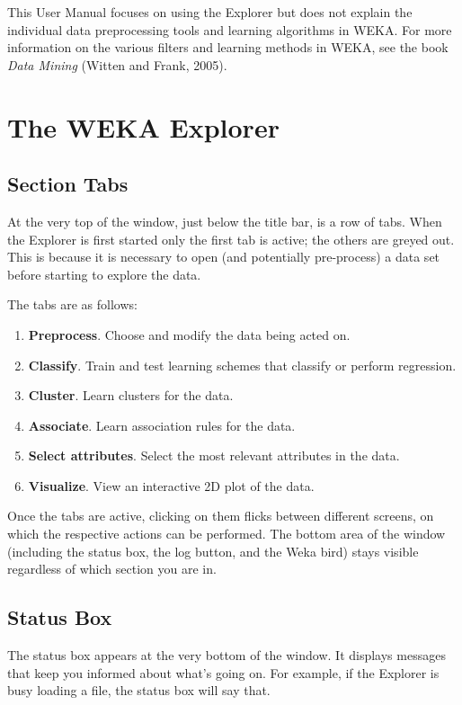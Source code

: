 \documentclass[a4paper]{article}
\begin{document}
This User Manual focuses on using the Explorer but does not explain
the individual data preprocessing tools and learning algorithms in
WEKA. For more information on the various filters and learning methods
in WEKA, see the book {\em Data Mining} (Witten and Frank, 2005).

\section{The WEKA Explorer}

\subsection{Section Tabs}

At the very top of the window, just below the title bar, is a row of
tabs. When the Explorer is first started only the first tab is active;
the others are greyed out. This is because it is necessary to open
(and potentially pre-process) a data set before starting to explore
the data.

The tabs are as follows:

\begin{enumerate}
\item \textbf{Preprocess}.
Choose and modify the data being acted on.
\item \textbf{Classify}.
Train and test learning schemes that classify or perform regression.
\item \textbf{Cluster}.
Learn clusters for the data.
\item \textbf{Associate}.
Learn association rules for the data.
\item \textbf{Select attributes}.
Select the most relevant attributes in the data.
\item \textbf{Visualize}.
View an interactive 2D plot of the data.
\end{enumerate}
\noindent
Once the tabs are active, clicking on them flicks between different
screens, on which the respective actions can be performed.  The bottom
area of the window (including the status box, the log button, and the
Weka bird) stays visible regardless of which section you are in.

\subsection{Status Box}

The status box appears at the very bottom of the window. It displays
messages that keep you informed about what's going on. For example, if
the Explorer is busy loading a file, the status box will say that.
\end{document}
